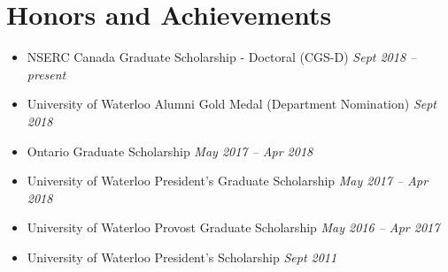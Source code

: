\section*{Honors and Achievements}
\vspace{\postsubhead}
\begin{adjustwidth}{\indentleft}{\indentright}
  \begin{itemize}
    \setlength\itemsep{0.2em}
    \item NSERC Canada Graduate Scholarship - Doctoral (CGS-D)
    \hfill
    \textit{Sept 2018 -- present}
    
    \item University of Waterloo Alumni Gold Medal (Department Nomination)
    \hfill
    \textit{Sept 2018}
    
    \item Ontario Graduate Scholarship
    \hfill
    \textit{May 2017 -- Apr 2018}
    
    \item University of Waterloo President's Graduate Scholarship
    \hfill
    \textit{May 2017 -- Apr 2018}
    
    \item University of Waterloo Provost Graduate Scholarship
    \hfill
    \textit{May 2016 -- Apr 2017}
    
    \item University of Waterloo President's Scholarship
    \hfill
    \textit{Sept 2011}
    
    
    
    
  \end{itemize}
\end{adjustwidth}
